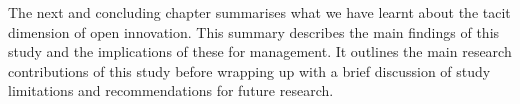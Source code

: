 The next and concluding chapter summarises what we have learnt about the tacit dimension of open innovation. This summary describes the main findings of this study and the implications of these for management. It outlines the main research contributions of this study before wrapping up with a brief discussion of study limitations and recommendations for future research.